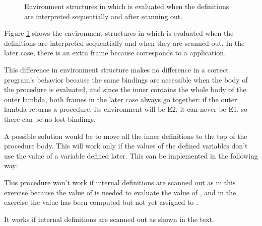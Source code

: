 \begin{exe}[4.17]
\begin{figure}
        \caption{Environment structures in which  is evaluated when 
        the definitions are interpreted sequentially and after scanning out.}
        \label{4.17fig}
    \end{figure}
    Figure \ref{4.17fig} shows the environment structures in which  
    is evaluated when the definitions are interpreted sequentially and when they 
    are scanned out. In the later case, there is an extra frame because 
     corresponds to a  application.

    This difference in environment structure makes no difference in a correct 
    program’s behavior because the same bindings are accessible when the body of 
    the procedure is evaluated, and since the inner  contains the 
    whole body of the outer lambda, both frames in the later case always go 
    together: if the outer lambda returns a procedure, its environment will be 
    E2, it can never be E1, so there can be no lost bindings.

    A possible solution would be to move all the inner definitions to the top of 
    the procedure body. This will work only if the values of the defined 
    variables don’t use the value of a variable defined later. This can be 
    implemented in the following way:
\end{exe}

\begin{exe}[4.18]
    This procedure won’t work if internal definitions are scanned out as in this 
    exercise because the value of  is needed to evaluate the value of 
    , and in the exercise the value has been computed but not yet 
    assigned to .

    It works if internal definitions are scanned out as shown in the text.
\end{exe}
